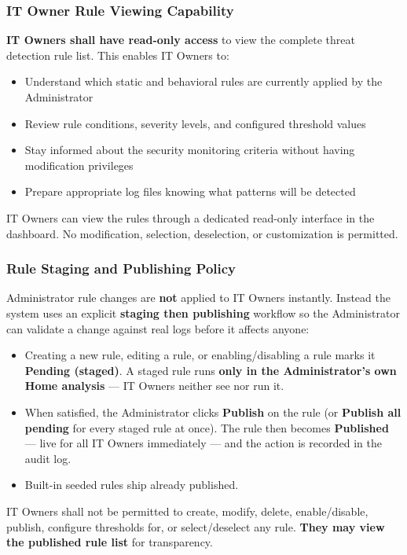 \documentclass[12pt,a4paper]{article}
\begin{document}
\subsubsection{IT Owner Rule Viewing Capability}
\textbf{IT Owners shall have read-only access} to view the complete threat detection rule list. This enables IT Owners to:
\begin{itemize}
    \item Understand which static and behavioral rules are currently applied by the Administrator
    \item Review rule conditions, severity levels, and configured threshold values
    \item Stay informed about the security monitoring criteria without having modification privileges
    \item Prepare appropriate log files knowing what patterns will be detected
\end{itemize}
IT Owners can view the rules through a dedicated read-only interface in the dashboard. No modification, selection, deselection, or customization is permitted.

\subsubsection{Rule Staging and Publishing Policy}
Administrator rule changes are \textbf{not} applied to IT Owners instantly. Instead the
system uses an explicit \textbf{staging then publishing} workflow so the Administrator can
validate a change against real logs before it affects anyone:
\begin{itemize}
    \item Creating a new rule, editing a rule, or enabling/disabling a rule marks it
          \textbf{Pending (staged)}. A staged rule runs \textbf{only in the
          Administrator's own Home analysis} --- IT Owners neither see nor run it.
    \item When satisfied, the Administrator clicks \textbf{Publish} on the rule (or
          \textbf{Publish all pending} for every staged rule at once). The rule then
          becomes \textbf{Published} --- live for all IT Owners immediately --- and the
          action is recorded in the audit log.
    \item Built-in seeded rules ship already published.
\end{itemize}
IT Owners shall not be permitted to create, modify, delete, enable/disable, publish,
configure thresholds for, or select/deselect any rule. \textbf{They may view the published
rule list} for transparency.
\end{document}
